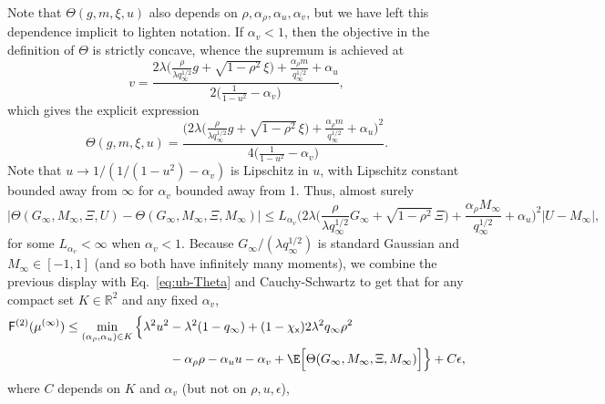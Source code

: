 \documentclass[]{article}
\def\sx{{\mathsf x}}
\def\reals{{\mathbb R}}
\def\sF{\mathsf{F}}
\begin{document}
Note that $\Theta(g,m,\xi,u)$ also depends on $\rho,\alpha_\rho,\alpha_u,\alpha_v$,
but we have left this dependence implicit to lighten notation.
If $\alpha_v < 1$, 
then the objective in the definition of $\Theta$ is strictly concave, 
whence the supremum is achieved at
\begin{equation}
    v = \frac{2\lambda\Big(\frac{\rho}{\lambda q_\infty^{1/2}} g + \sqrt{1-\rho^2}\,\xi\Big)+\frac{\alpha_\rho m}{q_\infty^{1/2}} + \alpha_u}{2\Big(\frac1{1-u^2} - \alpha_v\Big)},
\end{equation}
which gives the explicit expression 
\begin{equation}
\label{eq:simple-Theta}
    \Theta(g,m,\xi,u)
        =
        \frac{\Big(2\lambda\Big(\frac{\rho}{\lambda q_\infty^{1/2}} g + \sqrt{1-\rho^2}\,\xi\Big)+\frac{\alpha_\rho m}{q_\infty^{1/2}} + \alpha_u\Big)^2}{4\Big(\frac1{1-u^2} - \alpha_v\Big)}.
\end{equation}
Note that $u \rightarrow 1/(1/(1-u^2) - \alpha_v)$ is Lipschitz in $u$, with Lipschitz constant bounded away from $\infty$ for $\alpha_v$ bounded away from 1.
Thus, almost surely
\begin{equation}
    \big|
        \Theta(G_\infty,M_\infty,\Xi,U)
        -
        \Theta(G_\infty,M_\infty,\Xi,M_\infty)
    \big|
    \leq 
    L_{\alpha_v}\Big(2\lambda\Big(\frac{\rho}{\lambda q_\infty^{1/2}} G_\infty + \sqrt{1-\rho^2}\,\Xi\Big)+\frac{\alpha_\rho M_\infty}{q_\infty^{1/2}} + \alpha_u\Big)^2|U - M_\infty|,
\end{equation}
for some $L_{\alpha_v} < \infty$ when $\alpha_v < 1$.
Because $G_\infty/(\lambda q_{\infty}^{1/2})$ is standard Gaussian and $M_\infty \in [-1,1]$ (and so both have infinitely many moments),
we combine the previous display with Eq.~\eqref{eq:ub-Theta} and Cauchy-Schwartz to get that 
for any compact set $K \in \reals^2 $ and any fixed $\alpha_v$,
\begin{equation}
\begin{aligned}
    \sF^{(2)}(\mu^{(\infty)})
        \leq 
        \min_{(\alpha_\rho,\alpha_u) \in K}
        \Big\{
            \lambda^2u^2 &- \lambda^2(1-q_\infty) 
            + (1-\chi_{\sx})2\lambda^2 q_\infty \rho^2 
        \\
            &- \alpha_\rho \rho - \alpha_u u - \alpha_v
            +
                \E\Big[\Theta(G_\infty,M_\infty,\Xi,M_\infty)\Big]
            \Big\} + C\epsilon,
\end{aligned}
\end{equation}
where $C$ depends on $K$ and $\alpha_v$ (but not on $\rho,u,\epsilon$),
\end{document}
